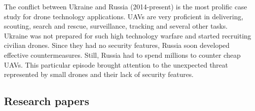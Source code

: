 \documentclass[journal]{IEEEtran}
\begin{document}
The conflict between Ukraine and Russia (2014-present) is the most prolific case study for drone technology applications. UAVs are very proficient in delivering, scouting, search and rescue, surveillance, tracking and several other tasks. Ukraine was not prepared for such high technology warfare and started recruiting civilian drones. Since they had no security features, Russia soon developed effective countermeasures. Still, Russia had to spend millions to counter cheap UAVs. This particular episode brought attention to the unexpected threat represented by small drones and their lack of security features.

\subsection{Research papers}
\end{document}
